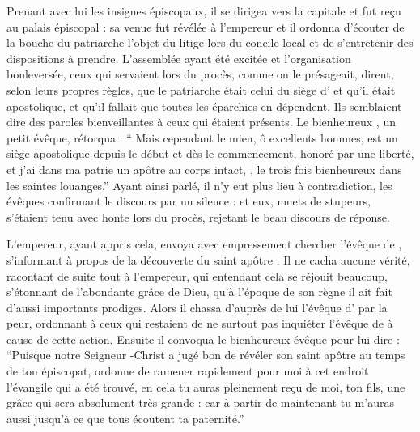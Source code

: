 Prenant avec lui les insignes épiscopaux,  il se dirigea vers la capitale et fut reçu au palais épiscopal : sa venue fut révélée à l'empereur  et   il ordonna d'écouter de la bouche du patriarche  l'objet du litige lors du concile local et de s'entretenir des dispositions à prendre. %
L'assemblée ayant été excitée et l'organisation bouleversée, ceux qui servaient lors du procès, comme on le présageait, dirent, selon leurs propres règles, que le patriarche était celui du siège d' et qu'il était apostolique, et qu'il fallait que toutes les éparchies en dépendent.
Ils semblaient dire des paroles bienveillantes à ceux qui étaient présents. 
Le bienheureux , un petit évêque, rétorqua : \enquote{
Mais cependant le mien, ô excellents hommes, est un siège apostolique depuis le  début et dès le commencement,  %
honoré par une liberté, et j'ai dans ma patrie un apôtre au corps intact, , le trois fois bienheureux dans les saintes louanges.}
Ayant ainsi parlé, il n'y eut plus lieu à contradiction, les évêques confirmant le discours par un silence : et eux, muets de stupeurs, s'étaient tenu avec  honte lors du procès,  rejetant le beau discours de réponse.

L'empereur, ayant appris cela, envoya  avec empressement chercher  l'évêque de , s'informant à propos de la découverte du saint apôtre . 
Il ne cacha aucune vérité, racontant de suite  tout à l'empereur, qui entendant cela se réjouit beaucoup, s'étonnant de l'abondante grâce de Dieu, qu'à l'époque de son règne il ait fait d'aussi importants prodiges.
Alors   il chassa d'auprès de lui l'évêque d' par la peur, ordonnant à ceux qui restaient de ne surtout pas inquiéter l'évêque  de  à cause de cette action. 
Ensuite il convoqua le bienheureux évêque  pour lui dire : 
\enquote{Puisque notre Seigneur -Christ a jugé bon de révéler son saint apôtre  au temps de ton épiscopat, ordonne de  ramener  rapidement pour moi à cet endroit l'évangile qui a été trouvé, en cela tu auras pleinement reçu de moi, ton fils, une grâce  qui sera absolument très grande :  %
car à partir de maintenant tu m'auras aussi  jusqu'à ce que tous écoutent ta paternité.}

